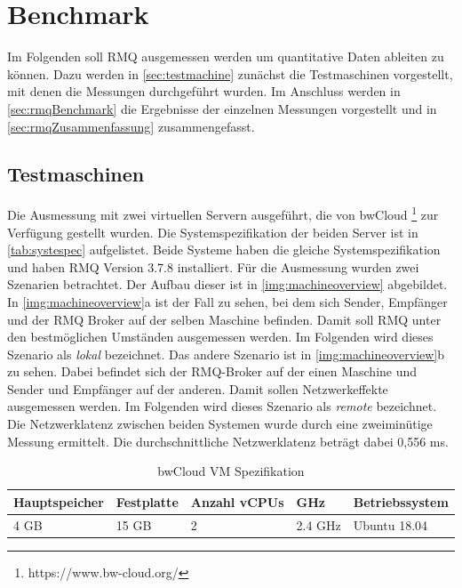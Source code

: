 \section{Benchmark}
Im Folgenden soll RMQ ausgemessen werden um quantitative Daten ableiten zu können. Dazu werden in \autoref{sec:testmachine} zunächst die Testmaschinen vorgestellt, mit denen die Messungen durchgeführt wurden. Im Anschluss werden in \autoref{sec:rmqBenchmark} die Ergebnisse der einzelnen Messungen vorgestellt und in \autoref{sec:rmqZusammenfassung} zusammengefasst.

\subsection{Testmaschinen}
\label{sec:testmachine}
Die Ausmessung mit zwei virtuellen Servern ausgeführt, die von bwCloud \footnote{https://www.bw-cloud.org/} zur Verfügung gestellt wurden. Die Systemspezifikation der beiden Server ist in \autoref{tab:systespec} aufgelistet. Beide Systeme haben die gleiche Systemspezifikation und haben RMQ Version 3.7.8 installiert. Für die Ausmessung wurden zwei Szenarien betrachtet. Der Aufbau dieser ist in \autoref{img:machineoverview} abgebildet. In \autoref{img:machineoverview}a ist der Fall zu sehen, bei dem sich Sender, Empfänger und der RMQ Broker auf der selben Maschine befinden. Damit soll RMQ unter den bestmöglichen Umständen ausgemessen werden. Im Folgenden wird dieses Szenario als \textit{lokal} bezeichnet. Das andere Szenario ist in \autoref{img:machineoverview}b zu sehen. Dabei befindet sich der RMQ-Broker auf der einen Maschine und Sender und Empfänger auf der anderen. Damit sollen Netzwerkeffekte ausgemessen werden. Im Folgenden wird dieses Szenario als \textit{remote} bezeichnet. Die Netzwerklatenz zwischen beiden Systemen wurde durch eine zweiminütige Messung ermittelt. Die durchschnittliche Netzwerklatenz beträgt dabei 0,556 ms. 

\begin{table}
  \centering
  \begin{tabular}{|l|l|l|l|l|}
    Hauptspeicher & Festplatte & Anzahl vCPUs & GHz & Betriebssystem \\
    \hline
     4 GB & 15 GB & 2 & 2.4 GHz & Ubuntu 18.04
  \end{tabular}
	\caption{\label{tab:systespec} bwCloud VM Spezifikation}
\end{table}


